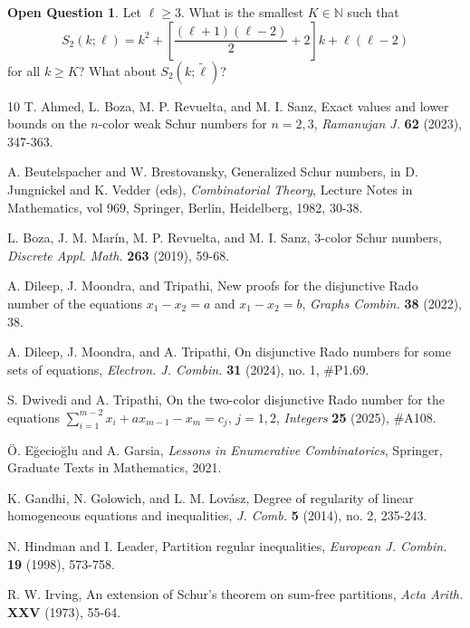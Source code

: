 \documentclass[11pt]{article}
\theoremstyle{definition}
\newtheorem{problem}[theorem]{Open Question}
\begin{document}
\begin{problem}
Let $\ell\geq3$. What is the smallest $K\in\mathbb{N}$ such that
\[
    S_2(k;\ell)= k^2+\left[\frac{(\ell+1)(\ell-2)}{2}+2\right]k+\ell(\ell-2)
    \]
for all $k\geq K$? What about $S_2(k;\tilde{\ell})$?
\end{problem}

\begin{thebibliography}{10}
 T. Ahmed, L. Boza, M. P. Revuelta, and M. I. Sanz, Exact values and lower bounds on the $n$-color weak Schur numbers for $n=2,3$, \textit{Ramanujan J.} \textbf{62} (2023), 347-363.

 A. Beutelspacher and W. Brestovansky, Generalized Schur numbers, in D. Jungnickel and K. Vedder (eds), \textit{Combinatorial Theory}, Lecture Notes in Mathematics, vol 969, Springer, Berlin, Heidelberg, 1982, 30-38.

 L. Boza, J. M. Mar\'{i}n, M. P. Revuelta, and M. I. Sanz, 3-color Schur numbers, \textit{Discrete Appl. Math.} \textbf{263} (2019), 59-68.

 A. Dileep, J. Moondra, and Tripathi, New proofs for the disjunctive Rado number of the equations $x_1-x_2=a$ and $x_1-x_2=b$, \textit{Graphs Combin.} \textbf{38} (2022), 38.

 A. Dileep, J. Moondra, and A. Tripathi, On disjunctive Rado numbers for some sets of equations, {\it Electron. J. Combin.} \textbf{31} (2024), no. 1, \#P1.69.

 S. Dwivedi and A. Tripathi, On the two-color disjunctive Rado number for the equations $\sum_{i=1}^{m-2}x_i+ax_{m-1}-x_m=c_j$, $j=1,2$, \textit{Integers} \textbf{25} (2025), \#A108.

 \"{O}. E\u{g}ecio\u{g}lu and A. Garsia,
\textit{Lessons in Enumerative Combinatorics}, Springer, Graduate Texts in Mathematics, 2021.

 K. Gandhi, N. Golowich, and L. M. Lov\'{a}sz, Degree of regularity of linear homogeneous equations and inequalities, \textit{J. Comb.} \textbf{5} (2014), no. 2, 235-243.

 N. Hindman and I. Leader, Partition regular inequalities, \textit{European J. Combin.} \textbf{19} (1998), 573-758.

 R. W. Irving, An extension of Schur’s theorem on sum-free partitions, \textit{Acta Arith.} \textbf{XXV} (1973), 55-64.


\end{thebibliography}
\end{document}
